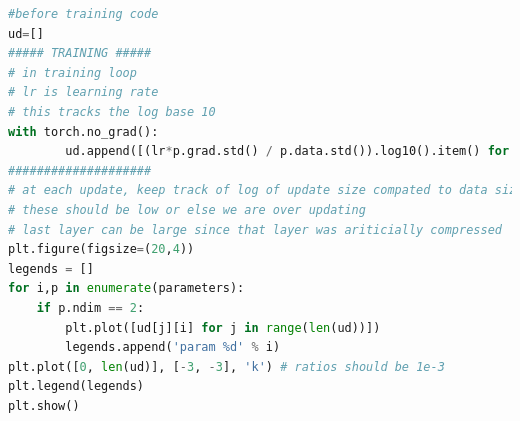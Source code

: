 \documentclass{article}
\begin{document}
\begin{lstlisting}[language=Python, caption={Size of update scaled by size of the parameter}, label={code:update-graph}]
#before training code
ud=[]
##### TRAINING #####
# in training loop
# lr is learning rate
# this tracks the log base 10
with torch.no_grad():
        ud.append([(lr*p.grad.std() / p.data.std()).log10().item() for p in parameters])
####################
# at each update, keep track of log of update size compated to data size
# these should be low or else we are over updating
# last layer can be large since that layer was ariticially compressed
plt.figure(figsize=(20,4))
legends = []
for i,p in enumerate(parameters):
    if p.ndim == 2:
        plt.plot([ud[j][i] for j in range(len(ud))])
        legends.append('param %d' % i)
plt.plot([0, len(ud)], [-3, -3], 'k') # ratios should be 1e-3
plt.legend(legends)
plt.show()
\end{lstlisting}
\end{document}
